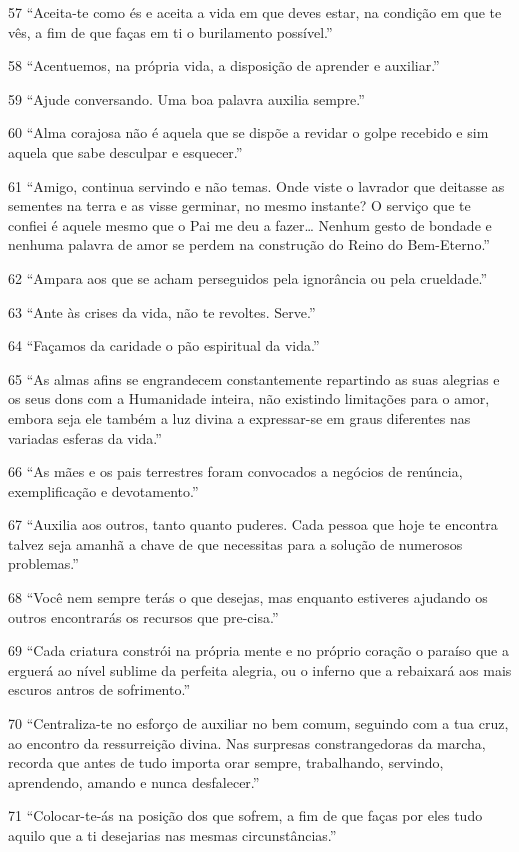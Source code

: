 57 ``Aceita-te como és e aceita a vida em que deves estar, na condição em que te vês, a fim de que faças em ti o burilamento possível.”

58 ``Acentuemos, na própria vida, a disposição de aprender e auxiliar.”

59 ``Ajude conversando. Uma boa palavra auxilia sempre.”

60 ``Alma corajosa não é aquela que se dispõe a revidar o golpe recebido e sim aquela que sabe desculpar e esquecer.”

61 ``Amigo, continua servindo e não temas. Onde viste o lavrador que deitasse as sementes na terra e as visse germinar, no mesmo instante? O serviço que te confiei é aquele mesmo que o Pai me deu a fazer… Nenhum gesto de bondade e nenhuma palavra de amor se perdem na construção do Reino do Bem-Eterno.”

62 ``Ampara aos que se acham perseguidos pela ignorância ou pela crueldade.”

63 ``Ante às crises da vida, não te revoltes. Serve.”

64 ``Façamos da caridade o pão espiritual da vida.”

65 ``As almas afins se engrandecem constantemente repartindo as suas alegrias e os seus dons com a Humanidade inteira, não existindo limitações para o amor, embora seja ele também a luz divina a expressar-se em graus diferentes nas variadas esferas da vida.”

66 ``As mães e os pais terrestres foram convocados a negócios de renúncia, exemplificação e devotamento.”

67 ``Auxilia aos outros, tanto quanto puderes. Cada pessoa que hoje te encontra talvez seja amanhã a chave de que necessitas para a solução de numerosos problemas.”

68 ``Você nem sempre terás o que desejas, mas enquanto estiveres ajudando os outros encontrarás os recursos que pre-cisa.”

69 ``Cada criatura constrói na própria mente e no próprio coração o paraíso que a erguerá ao nível sublime da perfeita alegria, ou o inferno que a rebaixará aos mais escuros antros de sofrimento.”

70 ``Centraliza-te no esforço de auxiliar no bem comum, seguindo com a tua cruz, ao encontro da ressurreição divina. Nas surpresas constrangedoras da marcha, recorda que antes de tudo importa orar sempre, trabalhando, servindo, aprendendo, amando e nunca desfalecer.”

71 ``Colocar-te-ás na posição dos que sofrem, a fim de que faças por eles tudo aquilo que a ti desejarias nas mesmas circunstâncias.”

